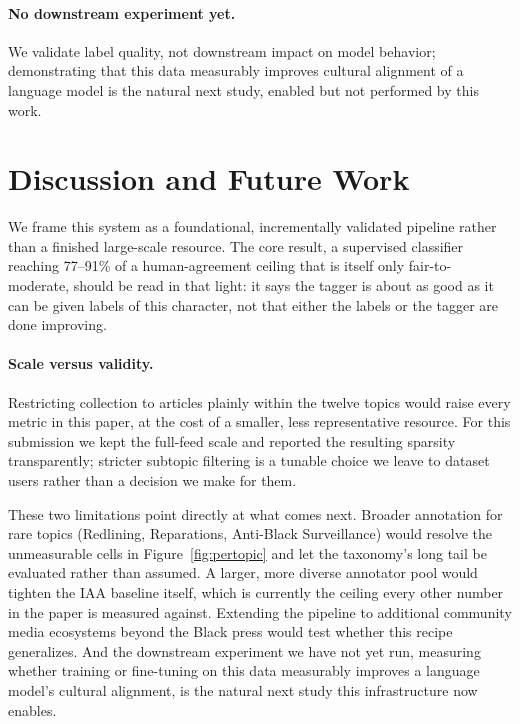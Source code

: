 \documentclass[letterpaper]{article}
\begin{document}
\paragraph{No downstream experiment yet.}
We validate label quality, not downstream impact on model behavior;
demonstrating that this data measurably improves cultural alignment of a
language model is the natural next study, enabled but not performed by
this work.

\section{Discussion and Future Work}
\label{sec:discussion}

We frame this system as a foundational, incrementally validated pipeline
rather than a finished large-scale resource. The core result, a
supervised classifier reaching 77--91\% of a human-agreement ceiling
that is itself only fair-to-moderate, should be read in that light: it
says the tagger is about as good as it can be given labels of this
character, not that either the labels or the tagger are done improving.

\paragraph{Scale versus validity.}
Restricting collection to articles plainly within the twelve topics
would raise every metric in this paper, at the cost of a smaller, less
representative resource. For this submission we kept the full-feed scale
and reported the resulting sparsity transparently; stricter subtopic
filtering is a tunable choice we leave to dataset users rather than a
decision we make for them.

These two limitations point directly at what comes next. Broader
annotation for rare topics (Redlining, Reparations, Anti-Black
Surveillance) would resolve the unmeasurable cells in
Figure~\ref{fig:pertopic} and let the taxonomy's long tail be evaluated
rather than assumed. A larger, more diverse annotator pool would tighten
the IAA baseline itself, which is currently the ceiling every other
number in the paper is measured against. Extending the pipeline to
additional community media ecosystems beyond the Black press would test
whether this recipe generalizes. And the downstream experiment we have
not yet run, measuring whether training or fine-tuning on this data
measurably improves a language model's cultural alignment, is the
natural next study this infrastructure now enables.
\end{document}
